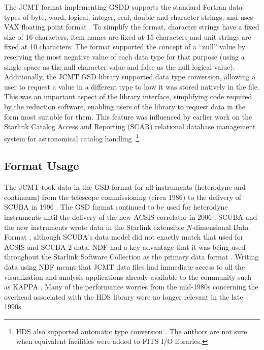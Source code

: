 \documentclass[final,authoryear,5p,times,twocolumn]{elsarticle}
\newcommand{\ascl}[1]{\href{http://www.ascl.net/#1}{ascl:#1}}
\begin{document}
The JCMT format implementing GSDD supports the standard Fortran data
types of byte, word, logical, integer, real, double and character
strings, and uses VAX floating point format \citep[see][for more
information on VAX floating point
format]{Payne:1980:VFP:641845.641849}. To simplify the format,
character strings have a fixed size of 16 characters, item names are
fixed at 15 characters and unit strings are fixed at 10
characters. The format supported the concept of a ``null'' value by
reserving the most negative value of each data type for that purpose
(using a single space as the null character value and false as the
null logical value). Additionally, the JCMT GSD library supported data
type conversion, allowing a user to request a value in a different
type to how it was stored natively in the file. This was an important
aspect of the library interface, simplifying code required by the
reduction software, enabling users of the library to request data in
the form most suitable for them. This feature was influenced by
earlier work on the Starlink Catalog Access and Reporting (SCAR)
relational database management system for astronomical catalog
handling \citep{SUN70}.\footnote{HDS also supported automatic type
  conversion \citep{SSN27}. The authors are not sure when equivalent
  facilities were added to FITS I/O libraries.}

\subsection{Format Usage}

The JCMT took data in the GSD format for all instruments (heterodyne
and continuum) from the telescope commissioning (circa 1986) to the
delivery of SCUBA in 1996 \citep{1999MNRAS.303..659H}. The GSD format
continued to be used for heterodyne instruments until the delivery of
the new ACSIS correlator in 2006 \citep{2009MNRAS.399.1026B}.  SCUBA
and the new instruments wrote data in the Starlink extensible
\emph{N}-dimensional Data Format \citep[NDF;][]{2015NDF}, although
SCUBA's data model did not exactly match that used for ACSIS and
SCUBA-2 \citep{2013MNRAS.430.2513H} data. NDF had a key advantage that
it was being used throughout the Starlink Software Collection as the
primary data format \citep{1992ASPC...25..126A}. Writing data using
NDF meant that JCMT data files had immediate access to all the
visualization and analysis applications already available to the
community such as KAPPA \citep[][\ascl{1403.022}]{SUN95}. Many of the
performance worries from the mid-1980s concerning the overhead
associated with the HDS library were no longer relevant in the late 1990s.
\end{document}
